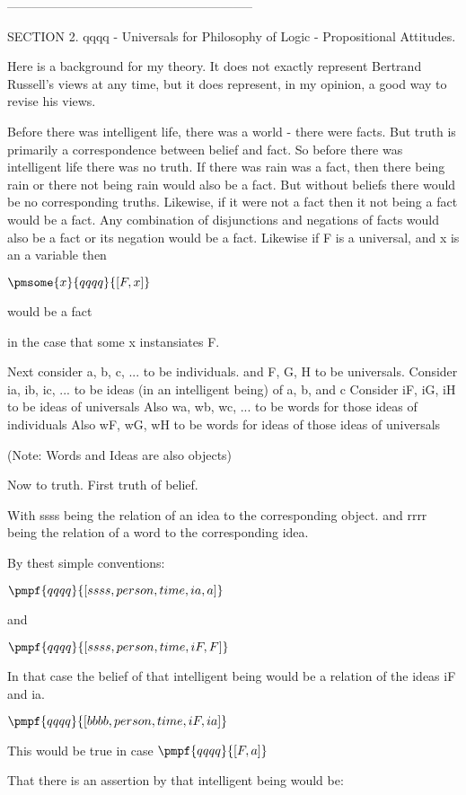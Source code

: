 \documentclass[12pt]{article}
\begin{document}
-----------------------------------------------------------

SECTION 2. qqqq - Universals for Philosophy of Logic - Propositional Attitudes.

Here is a background for my theory. It does not exactly
represent Bertrand Russell's views at any time, but it
does represent, in my opinion, a good way to revise
his views.

Before there was intelligent life, there was a world - there were facts.
But truth is primarily a correspondence between belief and fact.
So before there was intelligent life there was no truth.
If there was rain was a fact, then there being rain or there not
being rain would also be a fact. But without beliefs there would be
no corresponding truths.
Likewise, if it were not a fact then it not being a fact would be a fact.
Any combination of disjunctions and negations of facts would also
be a fact or its negation would be a fact.
Likewise if F is a universal, and x is an a variable then

$\pmsome{x}{qqqq}{[F,x]}$

would be a fact

in the case that some x instansiates F.

Next consider a, b, c, ... to be individuals.
and F, G, H to be universals. 
Consider ia, ib, ic, ... to be ideas (in an intelligent being) of a, b, and c
Consider iF, iG, iH to be ideas of universals
Also wa, wb, wc, ... to be words for those ideas of individuals
Also wF, wG, wH to be words for ideas of those ideas of universals

(Note: Words and Ideas are also objects)

Now to truth. First truth of belief.

With ssss being the relation of an idea to the corresponding object.
and rrrr being the relation of a word to the corresponding idea.

By thest simple conventions:

$\pmpf{qqqq}{[ssss, person, time, ia, a]}$

and

$\pmpf{qqqq}{[ssss, person, time, iF , F]} $

In that case the belief of that intelligent being would be a relation
of the ideas iF and ia.

$\pmpf{qqqq}{[bbbb, person, time, iF, ia]} $

This would be true in case $\pmpf{qqqq}{[F,a]}$

That there is an assertion by that intelligent being would be:
\end{document}

